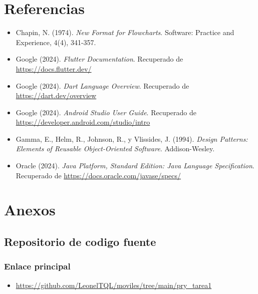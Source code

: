 \documentclass[12pt, a4paper]{article}
\begin{document}
\section{Referencias}
\begin{itemize}
    \item Chapin, N. (1974). \textit{New Format for Flowcharts}. Software: Practice and Experience, 4(4), 341-357.
  \item Google (2024). \textit{Flutter Documentation}. Recuperado de \url{https://docs.flutter.dev/}
  \item Google (2024). \textit{Dart Language Overview}. Recuperado de \url{https://dart.dev/overview}
  \item Google (2024). \textit{Android Studio User Guide}. Recuperado de \url{https://developer.android.com/studio/intro}
    \item Gamma, E., Helm, R., Johnson, R., y Vlissides, J. (1994). \textit{Design Patterns: Elements of Reusable Object-Oriented Software}. Addison-Wesley.
  \item Oracle (2024). \textit{Java Platform, Standard Edition: Java Language Specification}. Recuperado de \url{https://docs.oracle.com/javase/specs/}
\end{itemize}

\section{Anexos}
\subsection{Repositorio de codigo fuente}

\subsubsection{Enlace principal}
\begin{itemize}
  \item \url{https://github.com/LeonelTQL/moviles/tree/main/pry_tarea1}
\end{itemize}
\end{document}
